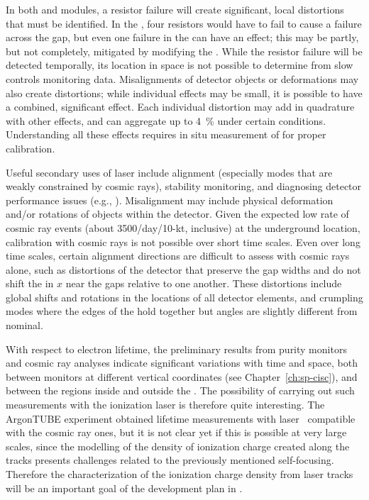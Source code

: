 In both \single and \dual modules, %
a resistor failure will create significant, local \efield distortions that must be identified. In the , %
four resistors would have to fail to cause a failure across the  gap, but even one failure in the  can have an effect; this may be partly, but not completely, mitigated by modifying the . While the resistor failure will be detected temporally, its location in space is not possible to determine from slow controls monitoring data. Misalignments of detector objects or deformations may also create \efield distortions; while individual effects may be small, it is possible to have a combined, significant effect.
Each individual \efield distortion may add in quadrature with other effects, and can aggregate up to \SI{4}{\%} under certain conditions. Understanding all these effects requires in situ  measurement of \efield for proper calibration. 

Useful secondary uses of laser include alignment (especially modes that are weakly constrained by cosmic rays),
stability monitoring, and diagnosing detector performance issues
(e.g., ).  
Misalignment may include physical deformation and/or rotations of objects within the detector. Given the expected low rate of cosmic ray events (about 3500/day/10-kt, inclusive) at the underground location, calibration with cosmic rays is not possible over short time scales. Even over long time scales, certain alignment directions  are difficult to assess with cosmic rays alone, such as distortions of the detector that preserve the gap widths and do not shift the  in $x$ near the gaps relative to one another.
These distortions include global shifts and rotations in the locations of all detector elements, and crumpling modes where the edges of the  hold together but angles are slightly different from nominal.   

With respect to electron lifetime, the preliminary results from  purity monitors and cosmic ray analyses indicate significant variations with time and space, both between monitors at different vertical coordinates (see Chapter~\ref{ch:sp-cisc}), and between the regions inside and outside the . The possibility of carrying out such measurements with the ionization laser is therefore quite interesting. The ArgonTUBE experiment obtained lifetime measurements with laser~\cite{Ereditato:2013xaa} compatible with the cosmic ray ones, but it is not clear yet if this is possible at very large scales, since the modelling of the density of ionization charge created along the tracks presents challenges related to the previously mentioned self-focusing. Therefore the characterization of the ionization charge density from laser tracks will be an important goal of the development plan in .


